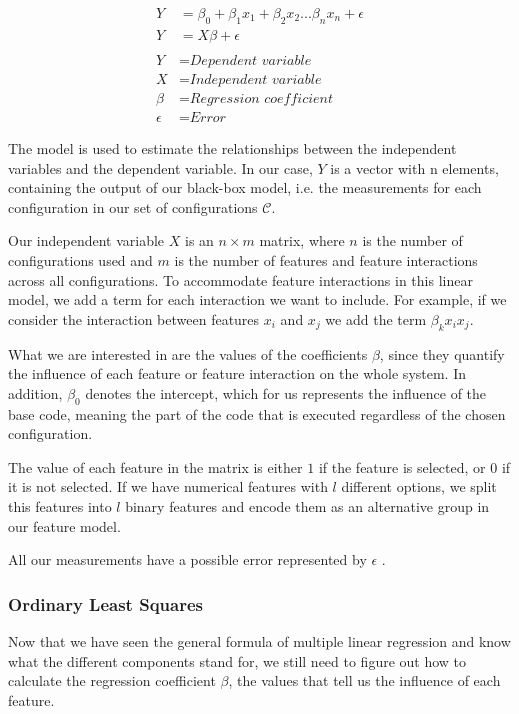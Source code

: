 \begin{align}\label{formula:linReg}
    Y &= \beta_0 + \beta_1 x_1 + \beta_2 x_2 ... \beta_n x_n + \epsilon   \\
    Y &= X \beta + \epsilon \nonumber\\ \nonumber \\ \nonumber
    Y &= \textit{Dependent variable}\\ \nonumber
    X &= \textit{Independent variable}\\ \nonumber
    \beta &= \textit{Regression coefficient}\\ \nonumber
    \epsilon &= \textit{Error} \nonumber
\end{align}

The model is used to estimate the relationships between the independent variables and the dependent variable.
In our case, $Y$ is a vector with n elements, containing the output of our black-box model, 
i.e. the measurements for each configuration in our set of configurations $\mathcal{C}$. 

Our independent variable $X$ is an $n \times m$ matrix, where $n$ is the number of configurations used and $m$ is the number of features and feature
interactions across all configurations.
To accommodate feature interactions in this linear model, we add a term for each interaction we want to include. For example,
if we consider the interaction between features $x_i$ and $x_j$ we add the term $\beta_k x_i x_j$. 

What we are interested in are the values of the coefficients $\beta$, since they quantify the influence of each feature or feature interaction
on the whole system. In addition, $\beta_0$ denotes the intercept, which for us represents the influence of the base code, meaning
the part of the code that is executed regardless of the chosen configuration.

The value of each feature in the matrix is either $1$ if the feature is selected, or $0$ if it is not selected. 
If we have numerical features with $l$ different options,
we split this features into $l$ binary features and encode them as an alternative group in our feature model.

All our measurements have a possible error represented by $\epsilon$ \cite{Linear-Regression}.

\subsubsection{Ordinary Least Squares}
Now that we have seen the general formula of multiple linear regression and know what the different components stand for, we still need to figure out 
how to calculate the regression coefficient $\beta$, the values that tell us the influence of each feature. 

